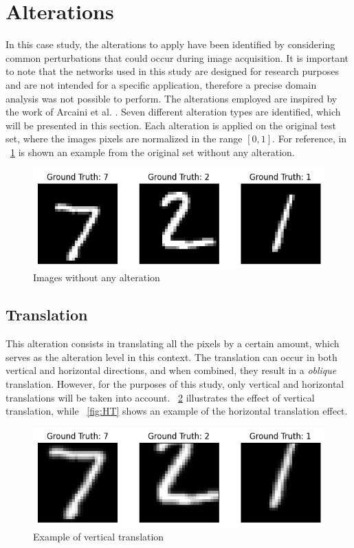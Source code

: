 \section{Alterations}

In this case study, the alterations to apply have been identified by considering common perturbations that could occur during image acquisition. It is important to note that the networks used in this study are designed for research purposes and are not intended for a specific application, therefore a precise domain analysis was not possible to perform. The alterations employed are inspired by the work of Arcaini et al. \cite{9176802}. Seven different alteration types are identified, which will be presented in this section. Each alteration is applied on the original test set, where the images pixels are normalized in the range $[0,1]$. For reference, in \Fig~\ref{fig:orig} is shown an example from the original set without any alteration.

\begin{figure}[h]
	\centering
	\includegraphics[width=0.6\linewidth]{ImageFiles/Alterations/orig}
	\caption{Images without any alteration}
	\label{fig:orig}
\end{figure}

\subsection{Translation}

This alteration consists in translating all the pixels by a certain amount, which serves as the alteration level in this context. The translation can occur in both vertical and horizontal directions, and when combined, they result in a \textit{oblique} translation. However, for the purposes of this study, only vertical and horizontal translations will be taken into account. \Fig~\ref{fig:VT} illustrates the effect of vertical translation, while \Fig~\ref{fig:HT} shows an example of the horizontal translation effect.

\begin{figure}[h]
	\centering
	\includegraphics[width=0.6\linewidth]{ImageFiles/Alterations/VT}
	\caption{Example of vertical translation}
	\label{fig:VT}
\end{figure}


